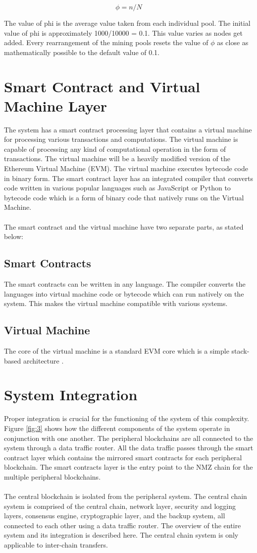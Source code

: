 \documentclass[a4paper,twoside,phd]{BYUPhys}
\begin{document}
\[\phi = n/N\]

The value of phi is the average value taken from each individual pool. The initial value of phi is approximately 1000/10000 = 0.1. This value varies as nodes get added. Every rearrangement of the mining pools resets the value of $\phi$ as close as mathematically possible to the default value of 0.1.


\section{Smart Contract and Virtual Machine Layer} 
The system has a smart contract processing layer that contains a virtual machine for processing various transactions and computations. The virtual machine is capable of processing any kind of computational operation in the form of transactions. The virtual machine will be a heavily modified version of the Ethereum Virtual Machine (EVM). The virtual machine executes bytecode code in binary form. The smart contract layer has an integrated compiler that converts code written in various popular languages such as JavaScript or Python to bytecode code which is a form of binary code that natively runs on the Virtual Machine.
\\
\\
The smart contract and the virtual machine have two separate parts, as stated below:
\subsection{Smart Contracts}
The smart contracts can be written in any language. The compiler converts the languages into virtual machine code or bytecode which can run natively on the system. This makes the virtual machine compatible with various systems.
\subsection{Virtual Machine}
The core of the virtual machine is a standard EVM core which is a simple stack-based architecture \cite{}. 
\section{System Integration}
 Proper integration is crucial for the functioning of the system of this complexity. Figure \ref{fig:3} shows how the different components of the system operate in conjunction with one another. The peripheral blockchains are all connected to the system through a data traffic router. All the data traffic passes through the smart contract layer which contains the mirrored smart contracts for each peripheral blockchain. The smart contracts layer is the entry point to the NMZ chain for the multiple peripheral blockchains.
\\
\\
The central blockchain is isolated from the peripheral system. The central chain system is comprised of the central chain, network layer, security and logging layers, consensus engine, cryptographic layer, and the backup system, all connected to each other using a data traffic router. The overview of the entire system and its integration is described here. The central chain system is only applicable to inter-chain transfers.
\end{document}

